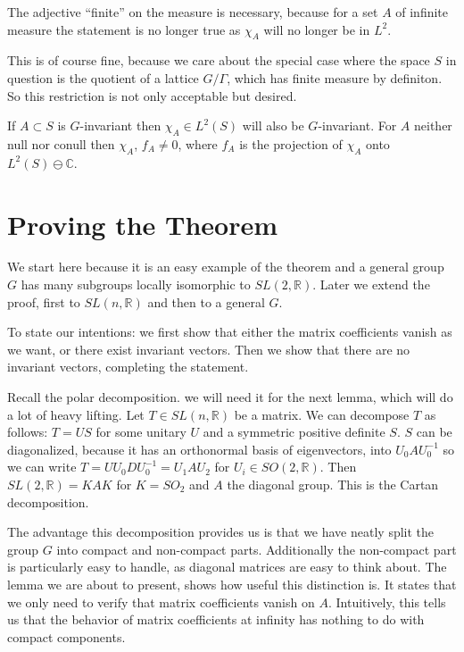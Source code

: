 \documentclass[
  12pt
]{article}
\theoremstyle{break}
\theoremstyle{plain}
\newcommand{\slnr}{\ensuremath{SL(n, \mathbb{R})}\xspace}
\begin{document}
  The adjective ``finite'' on the measure is necessary, because for a set
  $A$ of infinite measure the statement is no longer true as $\chi_A$
  will no longer be in $L^2$.

  This is of course fine, because we care about the special case where the
  space $S$ in question is the quotient of a lattice $G/\Gamma$, which has
  finite measure by definiton. So this restriction is not only acceptable but
  desired.

  If $A\subset S$ is $G$-invariant then $\chi_A\in L^2(S)$ will also
  be $G$-invariant. 
  For $A$ neither null nor conull then
  $\chi_A$, $f_A \neq 0$, where $f_A$ is the projection of
  $\chi_A$ onto $L^2(S) \ominus \mathbb{C}$.




\hypertarget{proof-for-sl2r}{%
\section{Proving the Theorem}\label{proof-for-sl2r}}


  We start here because it is an easy example of the theorem and a general
  group $G$ has many subgroups locally isomorphic to
  $SL(2, \mathbb{R})$. Later we extend the proof, first to
  $SL(n, \mathbb{R})$ and then to a general $G$.

  To state our intentions: we first show that either the matrix
  coefficients vanish as we want, or there exist invariant vectors. Then
  we show that there are no invariant vectors, completing the statement.

  Recall the polar decomposition. we will need it for the next lemma, which will do a lot of heavy lifting.
  Let $T \in \slnr$ be a matrix. We can decompose $T$ as follows:
  $T = US$ for some unitary $U$ and a symmetric positive definite $S$. $S$ can be
  diagonalized, because it has an orthonormal basis of eigenvectors, into $U_0 A U_0^{-1}$ so we can write
  $T = U U_0 D U_0^{-1} = U_1 A U_2$ for $U_i \in SO(2, \mathbb{R})$.
  Then $SL(2, \mathbb{R}) = KAK$ for $K = SO_2$ and $A$ the diagonal
  group. This is the Cartan decomposition.

  The advantage this decomposition provides us is that we have neatly split the group $G$ into compact and non-compact parts.
  Additionally the non-compact part is particularly easy to handle, as diagonal matrices are easy to think about.
  The lemma we are about to present, shows how useful this distinction is. It states that we only need to verify that matrix coefficients vanish on $A$.
  Intuitively, this tells us that the behavior of matrix coefficients at infinity has nothing to do with compact components.
\end{document}
